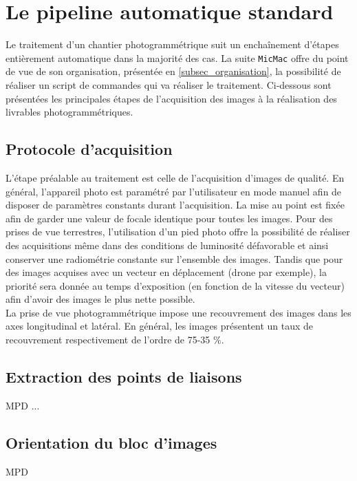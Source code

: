 \section{Le pipeline automatique standard}\label{sec_pipeline_auto}
Le traitement d'un chantier photogrammétrique suit un enchaînement d'étapes entièrement automatique dans la majorité des cas. La suite {\tt MicMac} offre du point de vue de son organisation, présentée en \ref{subsec_organisation}, la possibilité de réaliser un script de commandes qui va réaliser le traitement. Ci-dessous sont présentées les principales étapes de l'acquisition des images à la réalisation des livrables photogrammétriques.

\subsection{Protocole d'acquisition}
L'étape préalable au traitement est celle de l'acquisition d'images de qualité. En général, l'appareil photo est paramétré par l'utilisateur en mode manuel afin de disposer de paramètres constants durant l’acquisition. La mise au point est fixée afin de garder une valeur de focale identique pour toutes les images. Pour des prises de vue terrestres, l'utilisation d'un pied photo offre la possibilité de réaliser des acquisitions même dans des conditions de luminosité défavorable et ainsi conserver une radiométrie constante sur l'ensemble des images. Tandis que pour des images acquises avec un vecteur en déplacement (drone par exemple), la priorité sera donnée au temps d'exposition (en fonction de la vitesse du vecteur) afin d'avoir des images le plus nette possible.\newline
\\
La prise de vue photogrammétrique impose une recouvrement des images dans les axes longitudinal et latéral. En général, les images présentent un taux de recouvrement respectivement de l'ordre de 75-35 $\%$.

\subsection{Extraction des points de liaisons}
MPD
...
\subsection{Orientation du bloc d'images}
MPD